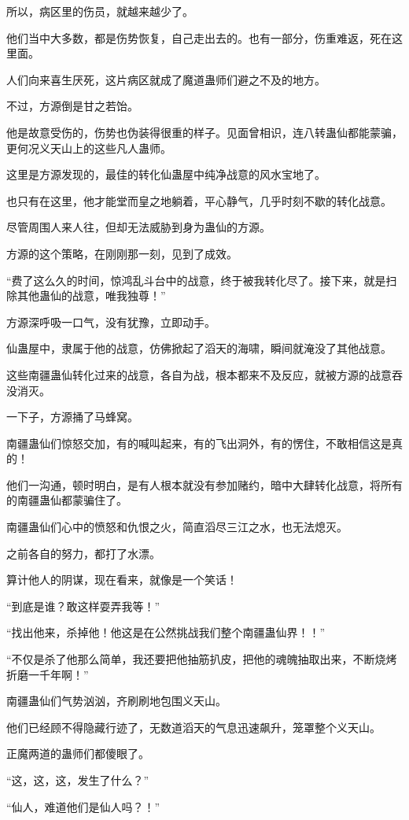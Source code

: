 \begin{this_body}
所以，病区里的伤员，就越来越少了。

他们当中大多数，都是伤势恢复，自己走出去的。也有一部分，伤重难返，死在这里面。

人们向来喜生厌死，这片病区就成了魔道蛊师们避之不及的地方。

不过，方源倒是甘之若饴。

他是故意受伤的，伤势也伪装得很重的样子。见面曾相识，连八转蛊仙都能蒙骗，更何况义天山上的这些凡人蛊师。

这里是方源发现的，最佳的转化仙蛊屋中纯净战意的风水宝地了。

也只有在这里，他才能堂而皇之地躺着，平心静气，几乎时刻不歇的转化战意。

尽管周围人来人往，但却无法威胁到身为蛊仙的方源。

方源的这个策略，在刚刚那一刻，见到了成效。

“费了这么久的时间，惊鸿乱斗台中的战意，终于被我转化尽了。接下来，就是扫除其他蛊仙的战意，唯我独尊！”

方源深呼吸一口气，没有犹豫，立即动手。

仙蛊屋中，隶属于他的战意，仿佛掀起了滔天的海啸，瞬间就淹没了其他战意。

这些南疆蛊仙转化过来的战意，各自为战，根本都来不及反应，就被方源的战意吞没消灭。

一下子，方源捅了马蜂窝。

南疆蛊仙们惊怒交加，有的喊叫起来，有的飞出洞外，有的愣住，不敢相信这是真的！

他们一沟通，顿时明白，是有人根本就没有参加赌约，暗中大肆转化战意，将所有的南疆蛊仙都蒙骗住了。

南疆蛊仙们心中的愤怒和仇恨之火，简直滔尽三江之水，也无法熄灭。

之前各自的努力，都打了水漂。

算计他人的阴谋，现在看来，就像是一个笑话！

“到底是谁？敢这样耍弄我等！”

“找出他来，杀掉他！他这是在公然挑战我们整个南疆蛊仙界！！”

“不仅是杀了他那么简单，我还要把他抽筋扒皮，把他的魂魄抽取出来，不断烧烤折磨一千年啊！”

南疆蛊仙们气势汹汹，齐刷刷地包围义天山。

他们已经顾不得隐藏行迹了，无数道滔天的气息迅速飙升，笼罩整个义天山。

正魔两道的蛊师们都傻眼了。

“这，这，这，发生了什么？”

“仙人，难道他们是仙人吗？！”


\end{this_body}
